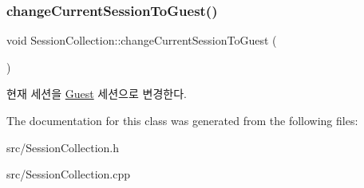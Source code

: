 \subsubsection{\texorpdfstring{change\+Current\+Session\+To\+Guest()}{changeCurrentSessionToGuest()}}
{\footnotesize\ttfamily void Session\+Collection\+::change\+Current\+Session\+To\+Guest (\begin{DoxyParamCaption}{ }\end{DoxyParamCaption})}

현재 세션을 \mbox{\hyperlink{class_guest}{Guest}} 세션으로 변경한다. 

The documentation for this class was generated from the following files\+:\begin{DoxyCompactItemize}
\item 
src/Session\+Collection.\+h\item 
src/Session\+Collection.\+cpp\end{DoxyCompactItemize}
